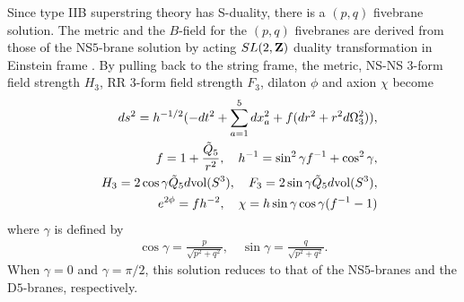 \documentclass[a4paper,12pt]{article}
\begin{document}
Since type IIB superstring theory has S-duality, 
there is a $(p,q)$ fivebrane solution.
The metric and the $B$-field for the $(p,q)$ fivebranes are derived 
from those of the NS$5$-brane solution
by acting $SL(2,{\bf Z})$ duality transformation 
in Einstein frame \cite{LuRo,AlOz}.
By pulling back to the string frame, the metric, NS-NS $3$-form field 
strength $H_3$, 
RR $3$-form field strength $F_3$, 
dilaton $\phi$ and axion $\chi$
become 
\begin{eqnarray}
&&ds^2
=h^{-1/2}
(-dt^2+\sum_{a=1}^5dx_a^2 + f (dr^2+ r^2 d\Omega_{3}^2)), \nonumber \\
&&f=1+{\tilde{Q}_5\over  r^2},\quad
h^{-1}=\sin^2\gamma f^{-1} +\cos^2\gamma, 
\nonumber \\
&&
H_3=2\cos\gamma\tilde{Q}_5 d{\rm vol}(S^3),\quad
F_3=2\sin\gamma\tilde{Q}_5 d{\rm vol}(S^3),\nonumber \\
&&e^{2\phi}=fh^{-2}, \quad \chi=h\sin\gamma\cos\gamma (f^{-1}-1)
\label{eq:pq5solution}
\end{eqnarray}
where $\gamma$ is defined by
\begin{eqnarray}
\cos\gamma=\frac{p}{\sqrt{p^2+q^2}},\quad \sin\gamma=\frac{q}{\sqrt{p^2+q^2}}.
\label{def gamma}
\end{eqnarray}
When $\gamma=0$ and $\gamma=\pi/2$, 
this solution reduces to that of the NS$5$-branes and the D$5$-branes, 
respectively.
\end{document}

